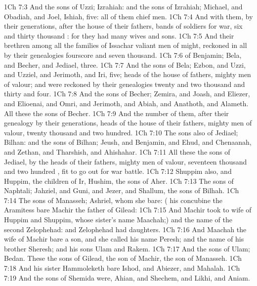 \vs 1Ch 7:3 And the sons of Uzzi; Izrahiah: and the sons of Izrahiah; Michael, and Obadiah, and Joel, Ishiah, five: all of them chief men.
\vs 1Ch 7:4 And with them, by their generations, after the house of their fathers,  bands of soldiers for war, six and thirty thousand : for they had many wives and sons.
\vs 1Ch 7:5 And their brethren among all the families of Issachar  valiant men of might, reckoned in all by their genealogies fourscore and seven thousand.
\vs 1Ch 7:6  of Benjamin; Bela, and Becher, and Jediael, three.
\vs 1Ch 7:7 And the sons of Bela; Ezbon, and Uzzi, and Uzziel, and Jerimoth, and Iri, five; heads of the house of  fathers, mighty men of valour; and were reckoned by their genealogies twenty and two thousand and thirty and four.
\vs 1Ch 7:8 And the sons of Becher; Zemira, and Joash, and Eliezer, and Elioenai, and Omri, and Jerimoth, and Abiah, and Anathoth, and Alameth. All these  the sons of Becher.
\vs 1Ch 7:9 And the number of them, after their genealogy by their generations, heads of the house of their fathers, mighty men of valour,  twenty thousand and two hundred.
\vs 1Ch 7:10 The sons also of Jediael; Bilhan: and the sons of Bilhan; Jeush, and Benjamin, and Ehud, and Chenaanah, and Zethan, and Tharshish, and Ahishahar.
\vs 1Ch 7:11 All these the sons of Jediael, by the heads of their fathers, mighty men of valour,  seventeen thousand and two hundred , fit to go out for war  battle.
\vs 1Ch 7:12 Shuppim also, and Huppim, the children of Ir,  Hushim, the sons of Aher.
\vs 1Ch 7:13 The sons of Naphtali; Jahziel, and Guni, and Jezer, and Shallum, the sons of Bilhah.
\vs 1Ch 7:14 The sons of Manasseh; Ashriel, whom she bare: ( his concubine the Aramitess bare Machir the father of Gilead:
\vs 1Ch 7:15 And Machir took to wife  of Huppim and Shuppim, whose sister's name  Maachah;) and the name of the second  Zelophehad: and Zelophehad had daughters.
\vs 1Ch 7:16 And Maachah the wife of Machir bare a son, and she called his name Peresh; and the name of his brother  Sheresh; and his sons  Ulam and Rakem.
\vs 1Ch 7:17 And the sons of Ulam; Bedan. These  the sons of Gilead, the son of Machir, the son of Manasseh.
\vs 1Ch 7:18 And his sister Hammoleketh bare Ishod, and Abiezer, and Mahalah.
\vs 1Ch 7:19 And the sons of Shemida were, Ahian, and Shechem, and Likhi, and Aniam.

